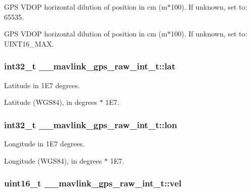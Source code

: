 G\+P\+S V\+D\+O\+P horizontal dilution of position in cm (m$\ast$100). If unknown, set to\+: 65535. 

G\+P\+S V\+D\+O\+P horizontal dilution of position in cm (m$\ast$100). If unknown, set to\+: U\+I\+N\+T16\+\_\+\+M\+A\+X. \hypertarget{struct____mavlink__gps__raw__int__t_aefd27d0b2d23c58a59b218aa151220d3}{
\subsubsection[{lat}]{\setlength{\rightskip}{0pt plus 5cm}int32\+\_\+t \+\_\+\+\_\+mavlink\+\_\+gps\+\_\+raw\+\_\+int\+\_\+t\+::lat}}\label{struct____mavlink__gps__raw__int__t_aefd27d0b2d23c58a59b218aa151220d3}


Latitude in 1\+E7 degrees. 

Latitude (W\+G\+S84), in degrees $\ast$ 1\+E7. \hypertarget{struct____mavlink__gps__raw__int__t_a025fd2dd700ff7180af5a26c2a3497f4}{
\subsubsection[{lon}]{\setlength{\rightskip}{0pt plus 5cm}int32\+\_\+t \+\_\+\+\_\+mavlink\+\_\+gps\+\_\+raw\+\_\+int\+\_\+t\+::lon}}\label{struct____mavlink__gps__raw__int__t_a025fd2dd700ff7180af5a26c2a3497f4}


Longitude in 1\+E7 degrees. 

Longitude (W\+G\+S84), in degrees $\ast$ 1\+E7. \hypertarget{struct____mavlink__gps__raw__int__t_a77e8cbdbf554637e4fbbdaaabd562eaf}{
\subsubsection[{vel}]{\setlength{\rightskip}{0pt plus 5cm}uint16\+\_\+t \+\_\+\+\_\+mavlink\+\_\+gps\+\_\+raw\+\_\+int\+\_\+t\+::vel}}\label{struct____mavlink__gps__raw__int__t_a77e8cbdbf554637e4fbbdaaabd562eaf}


